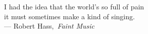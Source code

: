 
\thispagestyle{empty}


\vspace*{3cm}

\begin{center}
    I had the idea that the world's so full of pain \\
	it must sometimes make a kind of singing. \\ \medskip
    --- Robert Hass,\, \emph{Faint Music}    
\end{center}

\bigskip
